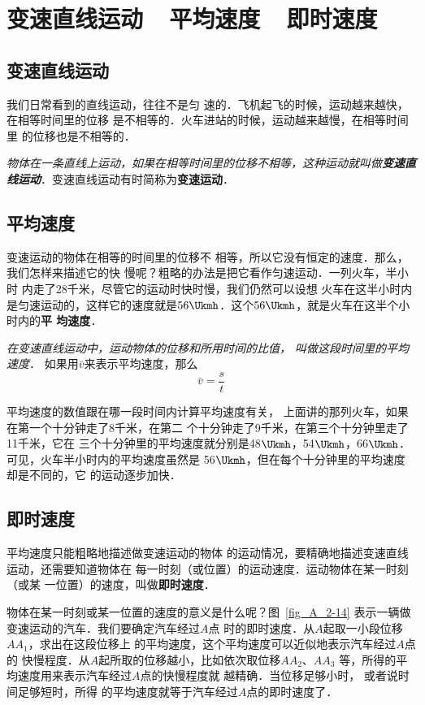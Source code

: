 \section{变速直线运动~~平均速度~~即时速度}
    \subsection{变速直线运动}
    
    我们日常看到的直线运动，往往不是匀
速的．飞机起飞的时候，运动越来越快，在相等时间里的位移
是不相等的．火车进站的时候，运动越来越慢，在相等时间里
的位移也是不相等的．

\textit{物体在一条直线上运动，如果在相等时间里的位移不相等，这种运动就叫做\textbf{变速直线运动}}．变速直线运动有时简称为\textbf{变速运动}．

\subsection{平均速度}

变速运动的物体在相等的时间里的位移不
相等，所以它没有恒定的速度．那么，我们怎样来描述它的快
慢呢？粗略的办法是把它看作匀速运动．一列火车，半小时
内走了28千米，尽管它的运动时快时慢，我们仍然可以设想
火车在这半小时内是匀速运动的，这样它的速度就是$56 \Ukmh$．这个$56 \Ukmh$，就是火车在这半个小时内的\textbf{平
均速度}．

\textit{在变速直线运动中，运动物体的位移和所用时间的比值，
叫做这段时间里的平均速度}．
如果用$\bar v$来表示平均速度，那么
\[\bar v=\frac{s}{t}\]

平均速度的数值跟在哪一段时间内计算平均速度有关，
上面讲的那列火车，如果在第一个十分钟走了8千米，在第二
个十分钟走了9千米，在第三个十分钟里走了11千米，它在
三个十分钟里的平均速度就分别是48$\Ukmh$，54$\Ukmh$，66$\Ukmh$．可见，火车半小时内的平均速度虽然是
56$\Ukmh$，但在每个十分钟里的平均速度却是不同的，它
的运动逐步加快．

\subsection{即时速度}
平均速度只能粗略地描述做变速运动的物体
的运动情况，要精确地描述变速直线运动，还需要知道物体在
每一时刻（或位置）的运动速度．运动物体在某一时刻（或某
一位置）的速度，叫做\textbf{即时速度}．

物体在某一时刻或某一位置的速度的意义是什么呢？图~\ref{fig_A_2-14} 
表示一辆做变速运动的汽车．我们要确定汽车经过$A$点
时的即时速度．从$A$起取一小段位移$AA_1$，求出在这段位移上
的平均速度，这个平均速度可以近似地表示汽车经过$A$点的
快慢程度．从$A$起所取的位移越小，比如依次取位移$AA_2$、$AA_3$
等，所得的平均速度用来表示汽车经过$A$点的快慢程度就
越精确．当位移足够小时，
或者说时间足够短时，所得
的平均速度就等于汽车经过$A$点的即时速度了．

